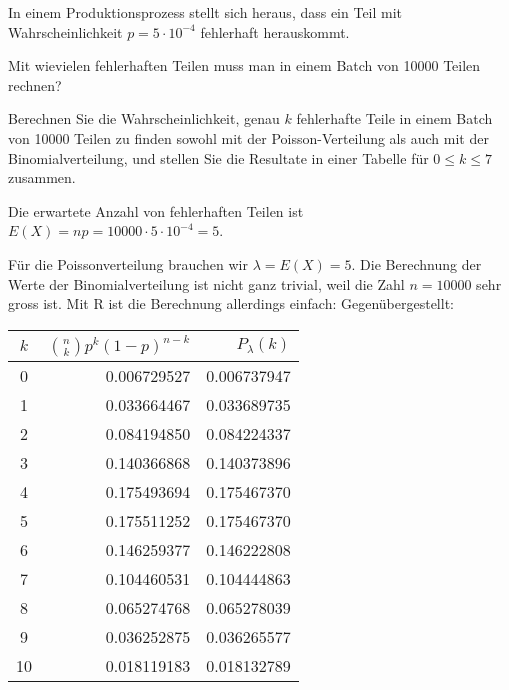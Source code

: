 In einem Produktionsprozess stellt sich heraus, dass ein Teil mit Wahrscheinlichkeit
$p=5\cdot10^{-4}$ fehlerhaft herauskommt.
\begin{teilaufgaben}
\item Mit wievielen fehlerhaften Teilen muss man in einem Batch von 10000 Teilen
rechnen?
\item Berechnen Sie die Wahrscheinlichkeit, genau $k$ fehlerhafte Teile in einem
Batch von 10000 Teilen zu finden sowohl mit der Poisson-Verteilung als auch
mit der Binomialverteilung, und stellen Sie die Resultate in einer Tabelle
für $0\le k\le 7$
zusammen.
\end{teilaufgaben}

\begin{loesung}
\begin{teilaufgaben}
\item Die erwartete Anzahl von fehlerhaften Teilen ist
$E(X)=np=10000\cdot 5\cdot10^{-4}=5$.
\item Für die Poissonverteilung brauchen wir $\lambda=E(X)=5$.
Die Berechnung der Werte der Binomialverteilung ist nicht ganz trivial, weil
die Zahl $n=10000$ sehr gross ist.
Mit R ist die Berechnung allerdings einfach:
Gegenübergestellt:
\begin{center}
\begin{tabular}{c|rr}
$k$&$\binom{n}{k}p^k(1-p)^{n-k}$&$P_\lambda(k)$\\
\hline
 0&0.006729527& 0.006737947\\
 1&0.033664467& 0.033689735\\
 2&0.084194850& 0.084224337\\
 3&0.140366868& 0.140373896\\
 4&0.175493694& 0.175467370\\
 5&0.175511252& 0.175467370\\
 6&0.146259377& 0.146222808\\
 7&0.104460531& 0.104444863\\
 8&0.065274768& 0.065278039\\
 9&0.036252875& 0.036265577\\
10&0.018119183& 0.018132789\\
\hline
\end{tabular}
\end{center}
\end{teilaufgaben}
\end{loesung}

